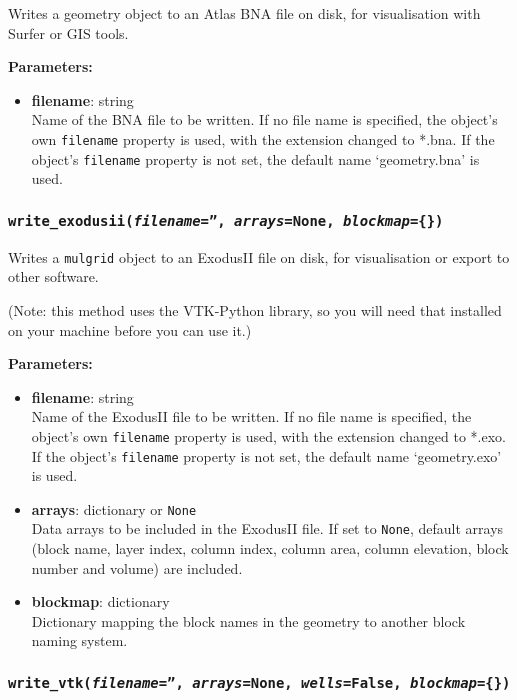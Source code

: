 Writes a geometry object to an Atlas BNA file on disk, for visualisation with Surfer or GIS tools.

\textbf{Parameters:}
\begin{itemize}
\item \textbf{filename}: string\\
  Name of the BNA file to be written.  If no file name is specified, the object's own \texttt{filename} property is used, with the extension changed to *.bna.  If the object's \texttt{filename} property is not set, the default name `geometry.bna' is used.
\end{itemize}

\begin{snugshade}\subsubsection{\texttt{write\_exodusii(\emph{filename}='', \emph{arrays}=None, \emph{blockmap}=\{\})}}\end{snugshade}
\label{sec:mulgrid:write_exodusii}

Writes a \texttt{mulgrid} object to an ExodusII file on disk, for visualisation or export to other software.

(Note: this method uses the VTK-Python library, so you will need that installed on your machine before you can use it.)

\textbf{Parameters:}
\begin{itemize}
\item \textbf{filename}: string\\
  Name of the ExodusII file to be written.  If no file name is specified, the object's own \texttt{filename} property is used, with the extension changed to *.exo.  If the object's \texttt{filename} property is not set, the default name `geometry.exo' is used.
\item \textbf{arrays}: dictionary or \texttt{None}\\
  Data arrays to be included in the ExodusII file.  If set to \texttt{None}, default arrays (block name, layer index, column index, column area, column elevation, block number and volume) are included.
\item \textbf{blockmap}: dictionary\\
  Dictionary mapping the block names in the geometry to another block naming system.
\end{itemize}

\begin{snugshade}\subsubsection{\texttt{write\_vtk(\emph{filename}='', \emph{arrays}=None, \emph{wells}=False, \emph{blockmap}=\{\})}}\end{snugshade}
\label{sec:mulgrid:write_vtk}

